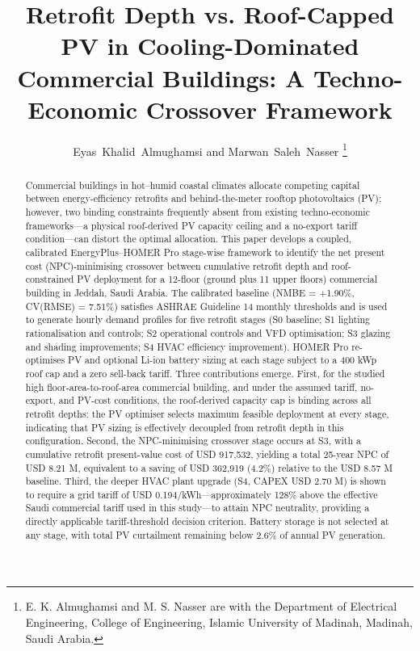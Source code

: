 \documentclass[journal,fleqn]{IEEEtran}
\begin{document}
\title{Retrofit Depth vs. Roof-Capped PV in Cooling-Dominated Commercial Buildings: A Techno-Economic Crossover Framework}

\author{Eyas~Khalid~Almughamsi and Marwan~Saleh~Nasser%
\thanks{E. K. Almughamsi and M. S. Nasser are with the Department of Electrical Engineering, College of Engineering, Islamic University of Madinah, Madinah, Saudi Arabia.}%
}

\maketitle

\begin{abstract}

Commercial buildings in hot--humid coastal climates allocate competing capital between energy-efficiency retrofits and behind-the-meter rooftop photovoltaics (PV); however, two binding constraints frequently absent from existing techno-economic frameworks---a physical roof-derived PV capacity ceiling and a no-export tariff condition---can distort the optimal allocation. This paper develops a coupled, calibrated EnergyPlus--HOMER Pro stage-wise framework to identify the net present cost (NPC)-minimising crossover between cumulative retrofit depth and roof-constrained PV deployment for a 12-floor (ground plus 11 upper floors) commercial building in Jeddah, Saudi Arabia. The calibrated baseline (NMBE = +1.90\%, CV(RMSE) = 7.51\%) satisfies ASHRAE Guideline 14 monthly thresholds and is used to generate hourly demand profiles for five retrofit stages (S0 baseline; S1 lighting rationalisation and controls; S2 operational controls and VFD optimisation; S3 glazing and shading improvements; S4 HVAC efficiency improvement). HOMER Pro re-optimises PV and optional Li-ion battery sizing at each stage subject to a 400 kWp roof cap and a zero sell-back tariff. Three contributions emerge. First, for the studied high floor-area-to-roof-area commercial building, and under the assumed tariff, no-export, and PV-cost conditions, the roof-derived capacity cap is binding across all retrofit depths: the PV optimiser selects maximum feasible deployment at every stage, indicating that PV sizing is effectively decoupled from retrofit depth in this configuration. Second, the NPC-minimising crossover stage occurs at S3, with a cumulative retrofit present-value cost of USD 917,532, yielding a total 25-year NPC of USD 8.21 M, equivalent to a saving of USD 362,919 (4.2\%) relative to the USD 8.57 M baseline. Third, the deeper HVAC plant upgrade (S4, CAPEX USD 2.70 M) is shown to require a grid tariff of USD 0.194/kWh---approximately 128\% above the effective Saudi commercial tariff used in this study---to attain NPC neutrality, providing a directly applicable tariff-threshold decision criterion. Battery storage is not selected at any stage, with total PV curtailment remaining below 2.6\% of annual PV generation.

\end{abstract}
\end{document}
